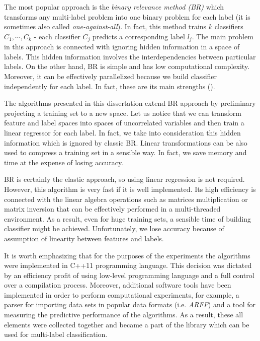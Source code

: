 The most popular approach is the \textit{binary relevance method (BR)} which transforms any multi-label problem into one binary problem for each label (it is sometimes also called \textit{one-against-all}). In fact, this method trains $k$ classifiers $C_1, \cdots, C_{k}$ - each classifier $C_j$ predicts a corresponding label $l_j$.  The main problem in this approach is connected with ignoring hidden information in a space of labels. This hidden information involves the interdependencies between particular labels. On the other hand, BR is simple and has low computational complexity. Moreover, it can be effectively parallelized because we build classifier independently for each label. In fact, these are its main strengths (\cite{Chain}).

The algorithms presented in this dissertation extend BR approach by preliminary projecting a training set to a new space. Let us notice that we can transform feature and label spaces into spaces of uncorrelated variables and then train a linear regressor for each label. In fact, we take into consideration this hidden information which is ignored by classic BR. Linear transformations can be also used to compress a training set in a sensible way. In fact, we save memory and time at the expense of losing accuracy. 

BR is certainly the elastic approach, so using linear regression is not required. However, this algorithm is very fast if it is well implemented. Its high efficiency is connected with the linear algebra operations such as matrices multiplication or matrix inversion that can be effectively performed in a multi-threaded environment. As a result, even for huge training sets, a sensible time of building classifier might be achieved. Unfortunately, we lose accuracy because of assumption of linearity between features and labels. 

It is worth emphasizing that for the purposes of the experiments the algorithms were implemented in C++11 programming language. This decision was dictated by an efficiency profit of using low-level programming language and a full control over a compilation process. Moreover, additional software tools have been implemented in order to perform computational experiments, for example, a parser for importing data sets in popular data formats (i.e. \textit{ARFF}) and a tool for measuring the predictive performance of the algorithms. As a result, these all elements were collected together and became a part of the library which can be used for multi-label classification.
